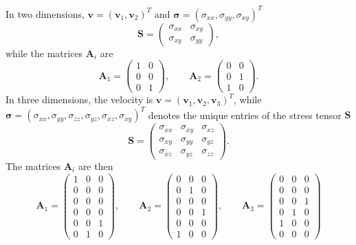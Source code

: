 \documentclass{siamart0216}
\newcommand{\LRp}[1]{\left( #1 \right)}
\begin{document}
In two dimensions, $\bm{v} = (\bm{v}_1, \bm{v}_2)^T$ and $\bm{\sigma}= (\sigma_{xx},\sigma_{yy},\sigma_{xy})^T$ 
\[
\bm{S} = \LRp{\begin{array}{cc}
\sigma_{xx} & \sigma_{xy}\\
\sigma_{xy} & \sigma_{yy}
\end{array}},
\]
while the matrices $\bm{A}_i$ are 
\[
\bm{A}_1 = \left(\begin{array}{cc}
1 & 0\\
0 & 0\\
0 & 1
\end{array}\right), \qquad 
\bm{A}_2 = \left(\begin{array}{cc}
0 & 0\\
0 & 1\\
1 & 0
\end{array}\right).
\]
In three dimensions, the velocity is $\bm{v} = (\bm{v}_1,\bm{v}_2,\bm{v}_3)^T$, while $\bm{\sigma}= (\sigma_{xx},\sigma_{yy},\sigma_{zz},\sigma_{yz},\sigma_{xz},\sigma_{xy})^T$ denotes the unique entries of the stress tensor $\bm{S}$
\[
\bm{S} = \LRp{\begin{array}{ccc}
\sigma_{xx} & \sigma_{xy} & \sigma_{xz}\\
\sigma_{xy} & \sigma_{yy}& \sigma_{yz}\\
\sigma_{xz} & \sigma_{yz}& \sigma_{zz}
\end{array}}.
\]
The matrices $\bm{A}_i$ are then
\[
\bm{A}_1 = \left(\begin{array}{ccc}
1 & 0 & 0\\
0 & 0& 0\\
0 & 0& 0\\
0 & 0& 0\\
0 & 0 & 1\\
0 & 1 & 0
\end{array}\right), \qquad 
\bm{A}_2 = \left(\begin{array}{ccc}
0 & 0 & 0\\
0 & 1 & 0\\
0 & 0 & 0\\
0 & 0 & 1\\
0 & 0 & 0\\
1 & 0 & 0
\end{array}\right), \qquad
\bm{A}_3 = \left(\begin{array}{ccc}
0 & 0 & 0\\
0 & 0 & 0\\
0 & 0 & 1\\
0 & 1 & 0\\
1 & 0 & 0\\
0 & 0 & 0
\end{array}\right)
\]
\end{document}
